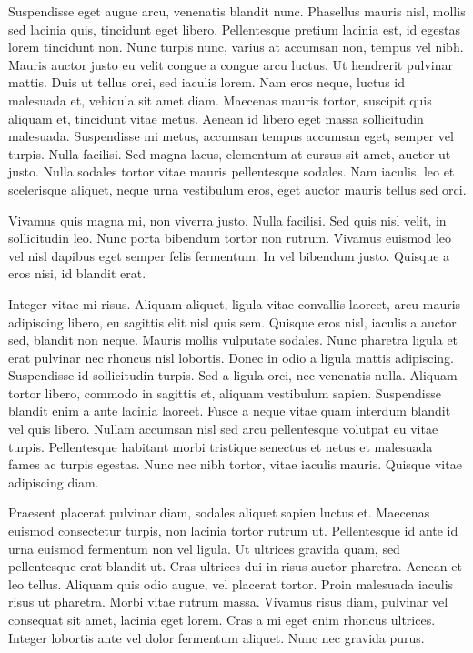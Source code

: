 \documentclass[a4paper]{article}
\begin{document}
Suspendisse eget augue arcu, venenatis blandit nunc. Phasellus mauris nisl, mollis sed lacinia quis, tincidunt eget libero. Pellentesque pretium lacinia est, id egestas lorem tincidunt non. Nunc turpis nunc, varius at accumsan non, tempus vel nibh. Mauris auctor justo eu velit congue a congue arcu luctus. Ut hendrerit pulvinar mattis. Duis ut tellus orci, sed iaculis lorem. Nam eros neque, luctus id malesuada et, vehicula sit amet diam. Maecenas mauris tortor, suscipit quis aliquam et, tincidunt vitae metus. Aenean id libero eget massa sollicitudin malesuada. Suspendisse mi metus, accumsan tempus accumsan eget, semper vel turpis. Nulla facilisi. Sed magna lacus, elementum at cursus sit amet, auctor ut justo. Nulla sodales tortor vitae mauris pellentesque sodales. Nam iaculis, leo et scelerisque aliquet, neque urna vestibulum eros, eget auctor mauris tellus sed orci.

Vivamus quis magna mi, non viverra justo. Nulla facilisi. Sed quis nisl velit, in sollicitudin leo. Nunc porta bibendum tortor non rutrum. Vivamus euismod leo vel nisl dapibus eget semper felis fermentum. In vel bibendum justo. Quisque a eros nisi, id blandit erat.

Integer vitae mi risus. Aliquam aliquet, ligula vitae convallis laoreet, arcu mauris adipiscing libero, eu sagittis elit nisl quis sem. Quisque eros nisl, iaculis a auctor sed, blandit non neque. Mauris mollis vulputate sodales. Nunc pharetra ligula et erat pulvinar nec rhoncus nisl lobortis. Donec in odio a ligula mattis adipiscing. Suspendisse id sollicitudin turpis. Sed a ligula orci, nec venenatis nulla. Aliquam tortor libero, commodo in sagittis et, aliquam vestibulum sapien. Suspendisse blandit enim a ante lacinia laoreet. Fusce a neque vitae quam interdum blandit vel quis libero. Nullam accumsan nisl sed arcu pellentesque volutpat eu vitae turpis. Pellentesque habitant morbi tristique senectus et netus et malesuada fames ac turpis egestas. Nunc nec nibh tortor, vitae iaculis mauris. Quisque vitae adipiscing diam.

Praesent placerat pulvinar diam, sodales aliquet sapien luctus et. Maecenas euismod consectetur turpis, non lacinia tortor rutrum ut. Pellentesque id ante id urna euismod fermentum non vel ligula. Ut ultrices gravida quam, sed pellentesque erat blandit ut. Cras ultrices dui in risus auctor pharetra. Aenean et leo tellus. Aliquam quis odio augue, vel placerat tortor. Proin malesuada iaculis risus ut pharetra. Morbi vitae rutrum massa. Vivamus risus diam, pulvinar vel consequat sit amet, lacinia eget lorem. Cras a mi eget enim rhoncus ultrices. Integer lobortis ante vel dolor fermentum aliquet. Nunc nec gravida purus.
\end{document}

